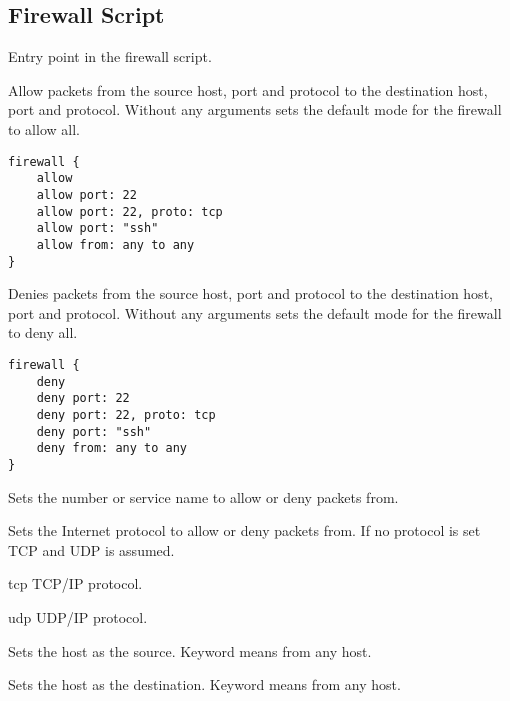 \subsection{Firewall Script}



Entry point in the firewall script.


Allow packets from the source host, port and protocol to the destination
host, port and protocol. Without any arguments sets the default mode for the 
firewall to allow all.

\begin{lstlisting}[style=Java]
firewall {
    allow
    allow port: 22
    allow port: 22, proto: tcp
    allow port: "ssh"
    allow from: any to any
}
\end{lstlisting}


Denies packets from the source host, port and protocol to the destination
host, port and protocol.
Without any arguments sets the default mode for the firewall to deny all.

\begin{lstlisting}[style=Java]
firewall {
    deny
    deny port: 22
    deny port: 22, proto: tcp
    deny port: "ssh"
    deny from: any to any
}
\end{lstlisting}


Sets the  number or service name to allow or deny packets from.


Sets the Internet protocol to allow or deny packets from. If no protocol
is set TCP and UDP is assumed.

\begin{compactdesc}
\item[tcp] TCP/IP protocol.
\item[udp] UDP/IP protocol.
\end{compactdesc}


Sets the host as the source. Keyword  means from any host.


Sets the host as the destination. Keyword  means from any host.

